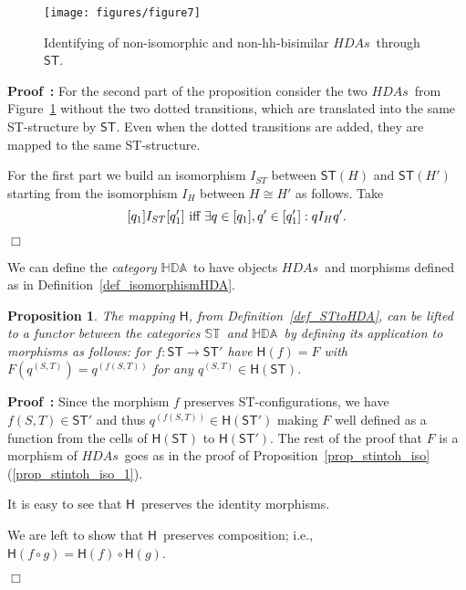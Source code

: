 \documentclass[submission,copyright,creativecommons]{eptcs}
\newtheorem{proposition}[theorem]{Proposition}
\newenvironment{proof}[1][\!\!\,]{\vspace{1ex}\noindent\textbf{Proof #1: }}{\hfill$\Box$\vspace{2ex}}
\newcommand{\cp}[1]{}
\newcommand\HDAs{\ensuremath{\mathit{HDAs}}}
\newcommand\ST{\ensuremath{\mathsf{ST}}}
\newcommand\allST{\ensuremath{\mathbb{ST}}}
\newcommand\allHDA{\ensuremath{\mathbb{HDA}}}
\newcommand\isomorphic{\ensuremath{\cong}}
\newcommand\stintoh{\ensuremath{\mathsf{H}}}
\newcommand\hintost{\ensuremath{\mathsf{ST}}}
\newcommand{\equivClass}[2][]{\ensuremath{[#2]\ifthenelse{\equal{#1}{}}{}{_{#1}}}}
\newcommand\hhequiv{\ensuremath{\stackrel{hh}{\sim}}}
\newcommand\categoryST{\ensuremath{\allST}}
\newcommand\categoryHDA{\ensuremath{\allHDA}}
\begin{document}
\begin{figure}[tp]
\psfrag{hh}{{\scriptsize $\hhequiv$}}
\psfrag{nhh}{{\scriptsize $\not\hhequiv$}}
\psfrag{iso}{{\scriptsize $\isomorphic$}}
\psfrag{niso}{{\scriptsize $\not\isomorphic$}}
\psfrag{HDA}{{\scriptsize on \HDAs}}
  \begin{center}
    \texttt{[image: figures/figure7]}
  \end{center}
\caption{Identifying of non-isomorphic and non-hh-bisimilar \HDAs\ through \hintost.}
\label{fig_ex_Glabbeek}
\end{figure}

\begin{proof}
For the second part of the proposition consider the two \HDAs\ from Figure~\ref{fig_ex_Glabbeek} without the two dotted transitions, which are translated into the same ST-structure by \hintost. Even when the dotted transitions are added, they are mapped to the same ST-structure.

For the first part we build an isomorphism $I_{ST}$ between  $\hintost(H)$ and $\hintost(H')$ starting from the isomorphism $I_{H}$ between $H\isomorphic H'$ as follows. Take 
\[
\equivClass{q_{1}} I_{ST} \equivClass{q'_{1}}\mbox{ iff }\exists q\in\equivClass{q_{1}},q'\in\equivClass{q'_{1}}:q I_{H} q'.
\]
\cp{Finish proof for part 1!!}
\end{proof}




We can define the \emph{category} \categoryHDA\ to have objects \HDAs\ and morphisms defined as in Definition~\ref{def_isomorphismHDA}.


\begin{proposition}
The mapping \stintoh, from Definition~\ref{def_STtoHDA}, can be lifted to a functor between the categories \categoryST\ and \categoryHDA\ by defining its application to morphisms as follows: for $f:\ST\rightarrow\ST'$ have $\stintoh(f)=F$ with $F(q^{(S,T)})=q^{(f(S,T))}$ for any $q^{(S,T)}\in\stintoh(\ST)$.
\end{proposition}

\begin{proof}
Since the morphism $f$ preserves ST-configurations, we have $f(S,T)\in\ST'$ and thus $q^{(f(S,T))}\in\stintoh(\ST')$ making $F$ well defined as a function from the cells of $\stintoh(\ST)$ to $\stintoh(\ST')$. The rest of the proof that $F$ is a morphism of \HDAs\ goes as in the proof of Proposition~\ref{prop_stintoh_iso}(\ref{prop_stintoh_iso_1}).

It is easy to see that \stintoh\ preserves the identity morphisms.

We are left to show that \stintoh\ preserves composition; i.e., $\stintoh(f\circ g)=\stintoh(f)\circ\stintoh(g)$.
\cp{Finish!!}
\end{proof}
\end{document}
